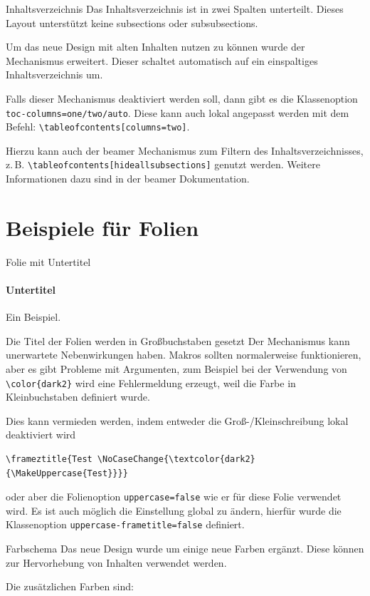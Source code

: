 \documentclass[
	ngerman,%
	accentcolor=9c,%
]{tudabeamer}
\newcommand*{\code}[1]{\texttt{#1}}
\begin{document}
\begin{frame}{Inhaltsverzeichnis}
	Das Inhaltsverzeichnis ist in zwei Spalten unterteilt. Dieses Layout unterstützt keine subsections oder subsubsections.

	Um das neue Design mit alten Inhalten nutzen zu können wurde der Mechanismus erweitert. Dieser schaltet automatisch auf ein einspaltiges Inhaltsverzeichnis um.

	Falls dieser Mechanismus deaktiviert werden soll, dann gibt es die Klassenoption \code{toc-columns=one/two/auto}. Diese kann auch lokal angepasst werden mit dem Befehl:
	\code{\textbackslash{}tableofcontents[columns=two]}.

	Hierzu kann auch der beamer Mechanismus zum Filtern des Inhaltsverzeichnisses, z.\,B. \code{\textbackslash{}tableofcontents[hideallsubsections]} genutzt werden. Weitere Informationen dazu sind in der beamer Dokumentation.
\end{frame}

\section{Beispiele für Folien}

\begin{frame}{Folie mit Untertitel}
	\framesubtitle{Untertitel}
	Ein Beispiel.
\end{frame}

\begin{frame}[fragile,uppercase=false]{Die Titel der Folien werden in Großbuchstaben gesetzt}
	Der Mechanismus kann unerwartete Nebenwirkungen haben.
	Makros sollten normalerweise funktionieren, aber es gibt Probleme mit Argumenten, zum Beispiel bei der Verwendung von \verb+\color{dark2}+ wird eine Fehlermeldung erzeugt, weil die Farbe in Kleinbuchstaben definiert wurde.

	Dies kann vermieden werden, indem entweder die Groß-/Kleinschreibung lokal deaktiviert wird
\begin{verbatim}
\frameztitle{Test \NoCaseChange{\textcolor{dark2}{\MakeUppercase{Test}}}}
\end{verbatim}
	oder aber die Folienoption \verb+uppercase=false+ wie er für diese Folie  verwendet wird.
	Es ist auch möglich die Einstellung global zu ändern, hierfür wurde die Klassenoption \verb+uppercase-frametitle=false+ definiert.
\end{frame}

\begin{frame}{Farbschema}
	Das neue Design wurde um einige neue Farben ergänzt. Diese können zur Hervorhebung von Inhalten verwendet werden.

	Die zusätzlichen Farben sind:

	\renewcommand*{\do}[1]{TUDa-####1: \textcolor{TUDa-####1}{\rule{1cm}{\ht\strutbox}}\par}
\end{frame}
\end{document}
